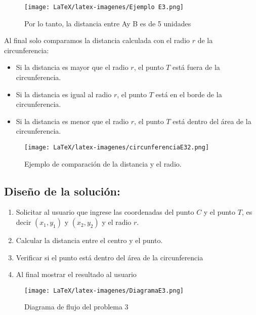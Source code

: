 \begin{figure}[h!]
    \centering
    \texttt{[image: LaTeX/latex-imagenes/Ejemplo E3.png]}
    \caption{Por lo tanto, la distancia entre Ay B es de 5 unidades}
    \label{fig:Ejemplo}
\end{figure}


Al final solo comparamos la distancia calculada con el radio $r$ de la circunferencia:

\begin{itemize}
\renewcommand\labelitemi{--}
\item Si la distancia es mayor que el radio $r$, el punto $T$ está fuera de la circunferencia.
\item Si la distancia es igual al radio $r$, el punto $T$ está en el borde de la circunferencia.
\item Si la distancia es menor que el radio $r$, el punto $T$ está dentro del área de la circunferencia.\\    
\end{itemize}

\begin{figure}[h!]
    \centering
    \texttt{[image: LaTeX/latex-imagenes/circunferenciaE32.png]}
    \caption{Ejemplo de comparación de la distancia y el radio.}
    \label{fig:uno}
\end{figure}


\subsection{\textbf{Diseño de la solución:}}

\begin{enumerate}
\item Solicitar al usuario que ingrese las coordenadas del punto $C$ y el punto $T$, es decir $(x_{1}, y_{1})$ y $(x_{2}, y_{2})$ y el radio $r$.
\item Calcular la distancia entre el centro y el punto.
\item Verificar si el punto está dentro del área de la circunferencia
\item Al final mostrar el resultado al usuario \\
\end{enumerate}

\begin{figure}[h!]
    \centering
    \texttt{[image: LaTeX/latex-imagenes/DiagramaE3.png]}
    \caption{Diagrama de flujo del problema 3}
    \label{fig:DiagrmadeFlujo}
\end{figure}


